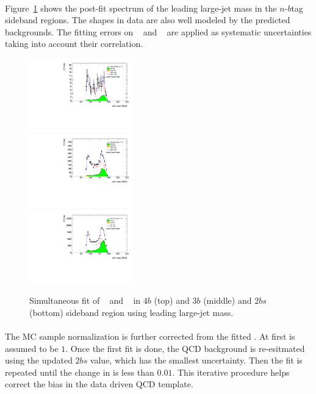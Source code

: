 \paragraph{}
Figure~\ref{fig:ttbar-fit} shows the post-fit spectrum of the leading large-\R jet mass in the $n$-$b$tag sideband regions.
The \mleadJ shapes in data are also well modeled by the predicted backgrounds. 
The fitting errors on \muqcd~ and \alphatt~ are applied as systematic uncertainties taking into account their correlation.

\begin{figure}[htbp!]
\begin{center}
 \includegraphics[width=0.4\textwidth,angle=-90]{figures/boosted/Fit/fitNorm_i4.pdf}\\
 \includegraphics[width=0.4\textwidth,angle=-90]{figures/boosted/Fit/fitNorm_i3.pdf}\\
 \includegraphics[width=0.4\textwidth,angle=-90]{figures/boosted/Fit/fitNorm_i2s.pdf}\\
\caption{Simultaneous fit of \muqcd~ and \alphatt~ in $4b$ (top) and $3b$ (middle) and $2bs$ (bottom) sideband region using leading large-\R jet mass.}
\label{fig:ttbar-fit}
\end{center}
\end{figure}

\paragraph{}
The \ttbar MC sample normalization is further corrected from the fitted \alphatt.
At first \alphatt is assumed to be $1$.
Once the first fit is done, the QCD background is re-esitmated using the updated $2bs$ \alphatt value, which has the smallest uncertainty.
Then the fit is repeated until the change in \alphatt is less than $0.01$.
This iterative procedure helps correct the \alphatt bias in the data driven QCD template.

